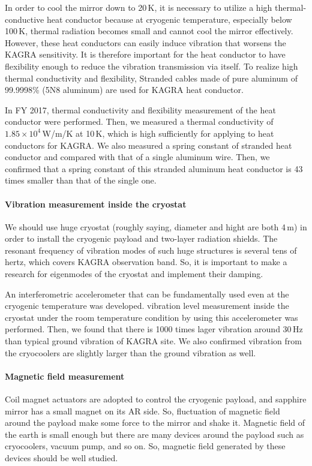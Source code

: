 In order to cool the mirror down to 20\,K, it is necessary to utilize a high thermal-conductive heat conductor because at cryogenic temperature, especially below 100\,K, thermal radiation becomes small and cannot cool the mirror effectively. However, these heat conductors can easily induce vibration that worsens the KAGRA sensitivity. It is therefore important for the heat conductor to have flexibility enough to reduce the vibration transmission via itself. To realize high thermal conductivity and flexibility, Stranded cables made of pure aluminum of 99.9998\% (5N8 aluminum) are used for KAGRA heat conductor.

In FY 2017, thermal conductivity and flexibility measurement of the heat conductor were performed. Then, we measured a thermal conductivity of $1.85\times10^{4}$\,W/m/K at 10\,K, which is high sufficiently for applying to heat conductors for KAGRA. We also measured a spring constant of stranded heat conductor and compared with that of a single aluminum wire. Then, we confirmed that a spring constant of this stranded aluminum heat conductor is 43 times smaller than that of the single one.

\paragraph*{\bi Vibration measurement inside the cryostat}
We should use huge cryostat (roughly saying, diameter and hight are both 4\,m) in order to install the cryogenic payload and two-layer radiation shields. The resonant frequency of vibration modes of such huge structures is several tens of hertz, which covers KAGRA observation band. So, it is important to make a research for eigenmodes of the cryostat and implement their damping.

An interferometric accelerometer that can be fundamentally used even at the cryogenic temperature was developed. vibration level measurement inside the cryostat under the room temperature condition by using this accelerometer was performed. Then, we found that there is 1000 times lager vibration around 30\,Hz than typical ground vibration of KAGRA site. We also confirmed vibration from the cryocoolers are slightly larger than the ground vibration as well. 

\paragraph*{\bi Magnetic field measurement}

Coil magnet actuators are adopted to control the cryogenic payload, and sapphire mirror has a small magnet on its AR side. So, fluctuation of magnetic field around the payload make some force to the mirror and shake it. Magnetic field of the earth is small enough but there are many devices around the payload such as cryocoolers, vacuum pump, and so on. So, magnetic field generated by these devices should be well studied.

